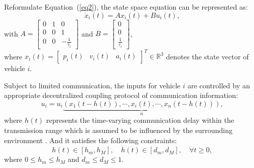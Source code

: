 \documentclass[journal]{IEEEtran}
\begin{document}
Reformulate Equation~(\ref{eq2}), the state space equation can be represented as:
\begin{equation}
  {\dot x_i}\left( t \right) = A{x_i}\left( t \right) + B{u_i}\left( t \right),
  \label{eq3}
\end{equation}
with $A = \left[ {\begin{array}{*{20}{c}}
          0 & 1 & 0                          \\
          0 & 0 & 1                          \\
          0 & 0 & { - \frac{1}{{{\tau _i}}}}
        \end{array}} \right]$ and $B = \left[ {\begin{array}{*{20}{c}}
          0 \\
          0 \\
          {\frac{1}{{{\tau _i}}}}
        \end{array}} \right]$,\\
where ${x_i}\left( t \right) = {\left[ {\begin{array}{*{20}{c}}
          {{p_i}\left( t \right)} & {{v_i}\left( t \right)} & {{a_i}\left( t \right)}
        \end{array}} \right]^T} \in {\mathbb{R}^3}$ denotes the state vector of vehicle $i$.

Subject to limited communication, the inputs for vehicle $i$ are controlled by an appropriate decentralized coupling protocol of communication information:
\begin{equation}
  {u_i} = {u_i}\underbrace {\left( {{x_1}\left( {t - h(t)} \right), \cdots ,{x_i}\left( t \right), \cdots ,{x_n}\left( {t - h(t)} \right)} \right)}_n,
  \label{eq4}
\end{equation}
where $ h(t) $ represents the time-varying communication delay within the transmission range which is assumed to be influenced by the surrounding environment \citep{jia_enhanced_2016,Vukadinovic2018,Vu2020,Martin-Sacristan2020,Pirani2022}. And it satisfies the following constraints:
\begin{equation}
  h(t) \in \left[ {{h_m},{h_M}} \right],\quad \dot h(t) \in \left[ {{d_m},{d_M}} \right],\quad \forall t \geqslant 0,
  \label{eq5}
\end{equation}
where $ 0 \leqslant {h_m} \leqslant {h_M} $ and $ {d_m} \leqslant {d_M} \leqslant 1 $.
\end{document}
